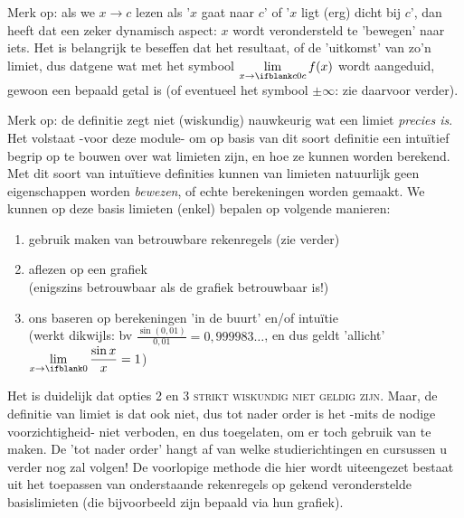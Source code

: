 \documentclass[numbers]{ximera}
\begin{document}
Merk op: als we  $x\to c$ lezen als '$x$ gaat naar $c$' of '$x$ ligt (erg) dicht bij $c$', dan heeft dat een zeker dynamisch aspect: $x$ wordt verondersteld te 'bewegen' naar iets. Het is belangrijk te beseffen dat het resultaat, of de 'uitkomst' van zo'n limiet, dus datgene wat met het symbool $\limx[c] f(x)$ wordt aangeduid, gewoon een bepaald getal is (of eventueel het symbool $\pm\infty$: zie daarvoor verder).


Merk op: de definitie zegt niet (wiskundig) nauwkeurig wat een limiet \textit{precies is}. Het volstaat -voor deze module- om op basis van dit soort definitie een intuïtief begrip op te bouwen over wat limieten zijn, en hoe ze kunnen worden berekend. Met dit soort van intuïtieve definities kunnen van limieten natuurlijk geen eigenschappen worden \textit{bewezen}, of echte berekeningen worden gemaakt. We kunnen op deze basis limieten (enkel) bepalen op volgende manieren:
\begin{enumerate}
	\item gebruik maken van betrouwbare rekenregels (zie verder)
	\item aflezen op een grafiek  
	\\(enigszins betrouwbaar als de grafiek betrouwbaar is!)
	\item ons baseren op berekeningen 'in de buurt' en/of intuïtie 
	\\(werkt dikwijls: bv $\frac{\sin(0,01)}{0,01}=0,999983\dots$, en dus geldt 'allicht' $\limx \frac{\sin x}{x} = 1$)
\end{enumerate}
Het is duidelijk dat opties 2 en  3 \textsc{strikt wiskundig niet geldig zijn}. Maar, de definitie van limiet is dat ook niet, dus tot nader order is het -mits de nodige voorzichtigheid- niet verboden, en dus toegelaten, om er toch gebruik van te maken. De 'tot nader order' hangt af van welke studierichtingen en cursussen u verder nog zal volgen! De voorlopige methode die hier wordt uiteengezet bestaat uit het toepassen van onderstaande rekenregels op gekend veronderstelde basislimieten (die bijvoorbeeld zijn bepaald via hun grafiek). 
\end{document}
